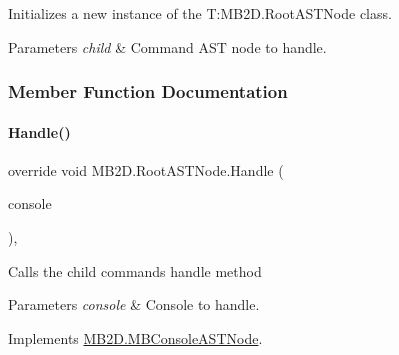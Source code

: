 Initializes a new instance of the T\+:\+M\+B2\+D.\+Root\+A\+S\+T\+Node class. 


\begin{DoxyParams}{Parameters}
{\em child} & Command A\+ST node to handle.\\
\hline
\end{DoxyParams}


\subsubsection{Member Function Documentation}
\hypertarget{class_m_b2_d_1_1_root_a_s_t_node_a16290285c34db0660c0a8006fa182d0d}{}\label{class_m_b2_d_1_1_root_a_s_t_node_a16290285c34db0660c0a8006fa182d0d} 
\paragraph{\texorpdfstring{Handle()}{Handle()}}
{\footnotesize\ttfamily override void M\+B2\+D.\+Root\+A\+S\+T\+Node.\+Handle (\begin{DoxyParamCaption}\item[{\hyperlink{class_m_b2_d_1_1_m_b_console}{M\+B\+Console}}]{console }\end{DoxyParamCaption})\hspace{0.3cm}{\ttfamily [inline]}, {\ttfamily [virtual]}}



Calls the child commands handle method 


\begin{DoxyParams}{Parameters}
{\em console} & Console to handle.\\
\hline
\end{DoxyParams}


Implements \hyperlink{class_m_b2_d_1_1_m_b_console_a_s_t_node_aa70a49e61ab623698af4ed8fda4ebbf5}{M\+B2\+D.\+M\+B\+Console\+A\+S\+T\+Node}.

